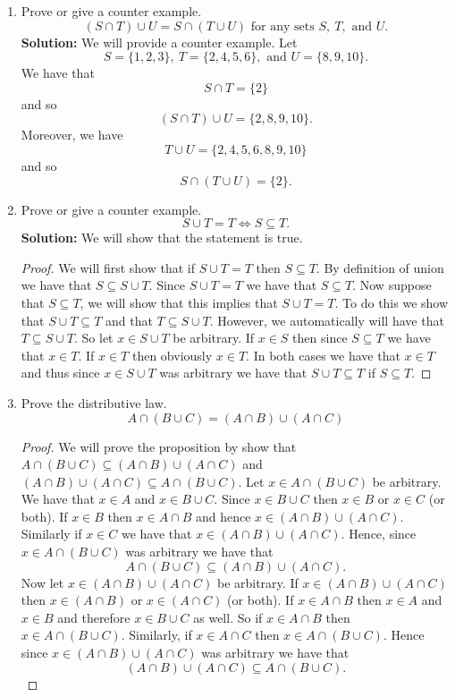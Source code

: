 \documentclass[12pt,letterpaper]{article}
\theoremstyle{plain}
\theoremstyle{definition}
\begin{document}
\begin{enumerate}[1.]
\item Prove or give a counter example. 
\[(S\cap T) \cup U=S\cap(T\cup U)\text{ for any sets }S,\ T, \text{ and }U.\]
{\bf Solution:} We will provide a counter example. Let 
\[S=\{1,2,3\},\ T=\{2,4,5,6\}, \text{ and }U=\{8,9,10\}.\]
We have that
\[S\cap T=\{2\}\]
and so 
\[(S\cap T)\cup U=\{2,8,9,10\}.\]
Moreover, we have 
\[T\cup U=\{2,4,5,6,8,9,10\}\]
and so 
\[S\cap(T\cup U)=\{2\}.\]
\item Prove or give a counter example.
\[S\cup T = T \Longleftrightarrow S\subseteq T.\]
{\bf Solution: }We will show that the statement is true.
\begin{proof} We will first show that if $S\cup T=T$ then $S\subseteq T$. By definition of union we have that $S\subseteq S\cup T$. Since $S\cup T=T$ we have that $S\subseteq T$. Now suppose that $S\subseteq T$, we will show that this implies that $S\cup T=T$. To do this we show that $S\cup T\subseteq T$ and that $T\subseteq S\cup T$. However, we automatically will have that $T\subseteq S\cup T$. So let $x\in S\cup T$ be arbitrary. If $x\in S$ then since $S\subseteq T$ we have that $x\in T$. If $x\in T$ then obviously $x\in T$. In both cases we have that $x\in T$ and thus since $x\in S\cup T$ was arbitrary we have that $S\cup T\subseteq T$ if $S\subseteq T$.
\end{proof}
\item Prove the distributive law. 
\[A\cap(B\cup C) =(A\cap B) \cup (A\cap C)\]
\begin{proof}We will prove the proposition by show that $A\cap (B\cup C)\subseteq (A\cap B)\cup (A\cap C)$ and 
$(A\cap B)\cup (A\cap C)\subseteq A\cap(B\cup C)$. Let $x\in A\cap (B\cup C)$ be arbitrary. We have that $x\in A$ and $x\in B\cup C$. Since $x\in B\cup C$ then $x\in B$ or $x\in C$ (or both). If $x\in B$ then $x\in A\cap B$ and hence $x\in (A\cap B)\cup (A\cap C)$. Similarly if $x\in C$ we have that $x\in (A\cap B)\cup (A\cap C)$. Hence, since $x\in A\cap (B\cup C)$ was arbitrary we have that 
\[A\cap (B\cup C)\subseteq (A\cap B)\cup (A\cap C).\]
Now let $x\in (A\cap B)\cup (A\cap C)$ be arbitrary. If $x\in (A\cap B)\cup (A\cap C)$ then $x\in (A\cap B)$ or $x\in (A\cap C)$ (or both). If $x\in A\cap B$ then $x\in A$ and $x\in B$ and therefore $x\in B\cup C$ as well. So if $x\in A\cap B$ then $x\in A\cap (B\cup C)$. Similarly, if $x\in A\cap C$ then $x\in A\cap (B\cup C)$. Hence since $x\in (A\cap B)\cup (A\cap C)$ was arbitrary we have that 
\[(A\cap B)\cup (A\cap C)\subseteq A\cap (B\cup C).\]
\end{proof}
\end{enumerate}
\end{document}
